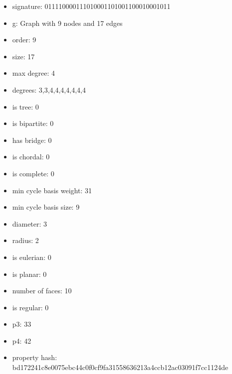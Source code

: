 \newpage
\begin{figure}
\end{figure}
\begin{itemize}
\item signature: 011110000111010001101001100010001011
\item g: Graph with 9 nodes and 17 edges
\item order: 9
\item size: 17
\item max degree: 4
\item degrees: 3,3,4,4,4,4,4,4,4
\item is tree: 0
\item is bipartite: 0
\item has bridge: 0
\item is chordal: 0
\item is complete: 0
\item min cycle basis weight: 31
\item min cycle basis size: 9
\item diameter: 3
\item radius: 2
\item is eulerian: 0
\item is planar: 0
\item number of faces: 10
\item is regular: 0
\item p3: 33
\item p4: 42
\item property hash: bd172241c8e0075ebc44c0f0cf9fa31558636213a4ccb12ac03091f7cc1124de
\end{itemize}
